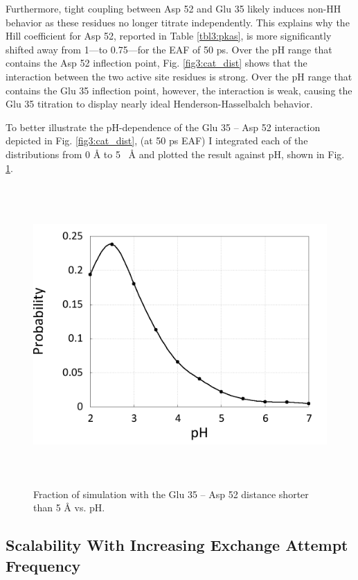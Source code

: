 Furthermore, tight coupling between Asp 52 and Glu 35 likely induces non-HH
behavior as these residues no longer titrate independently.  This explains why
the Hill coefficient for Asp 52, reported in Table \ref{tbl3:pkas}, is more
significantly shifted away from 1---to 0.75---for the EAF of 50 ps.
Over the pH range that contains the Asp 52 inflection point, Fig.
\ref{fig3:cat_dist} shows that the interaction between the two active site
residues is strong.  Over the pH range that contains the Glu 35 inflection
point, however, the interaction is weak, causing the Glu 35 titration to display
nearly ideal Henderson-Hasselbalch behavior.

To better illustrate the pH-dependence of the Glu 35 -- Asp 52 interaction
depicted in Fig. \ref{fig3:cat_dist}, (at 50 ps EAF) I integrated
each of the distributions from 0 \mbox{\normalfont \AA} to 5 \mbox{\normalfont
\AA} and plotted the result against pH, shown in Fig. \ref{fig3:cat_dist_int}.

\begin{figure}
 \includegraphics[width=6in, height=4.5in]{Catalytic_Distances_Int.png}
 \caption{Fraction of simulation with the Glu 35 -- Asp 52 distance shorter than
          5 \mbox{\normalfont \AA} vs. pH.}
 \label{fig3:cat_dist_int}
\end{figure}

\subsection{Scalability With Increasing Exchange Attempt Frequency}

